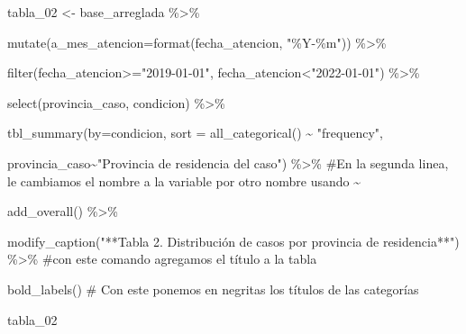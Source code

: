 \documentclass[
  letterpaper,
  DIV=11,
  numbers=noendperiod]{scrreprt}
\newenvironment{Shaded}{\begin{snugshade}}{\end{snugshade}}
\newcommand{\AttributeTok}[1]{\textcolor[rgb]{0.40,0.45,0.13}{#1}}
\newcommand{\CommentTok}[1]{\textcolor[rgb]{0.37,0.37,0.37}{#1}}
\newcommand{\FunctionTok}[1]{\textcolor[rgb]{0.28,0.35,0.67}{#1}}
\newcommand{\NormalTok}[1]{\textcolor[rgb]{0.00,0.23,0.31}{#1}}
\newcommand{\OtherTok}[1]{\textcolor[rgb]{0.00,0.23,0.31}{#1}}
\newcommand{\SpecialCharTok}[1]{\textcolor[rgb]{0.37,0.37,0.37}{#1}}
\newcommand{\StringTok}[1]{\textcolor[rgb]{0.13,0.47,0.30}{#1}}
\begin{document}
\begin{Shaded}
\begin{Highlighting}[]
\NormalTok{tabla\_02 }\OtherTok{\textless{}{-}}\NormalTok{ base\_arreglada }\SpecialCharTok{\%\textgreater{}\%}
  
  \FunctionTok{mutate}\NormalTok{(}\AttributeTok{a\_mes\_atencion=}\FunctionTok{format}\NormalTok{(fecha\_atencion, }\StringTok{"\%Y{-}\%m"}\NormalTok{)) }\SpecialCharTok{\%\textgreater{}\%} 
 
  \FunctionTok{filter}\NormalTok{(fecha\_atencion}\SpecialCharTok{\textgreater{}=}\StringTok{"2019{-}01{-}01"}\NormalTok{, fecha\_atencion}\SpecialCharTok{\textless{}}\StringTok{"2022{-}01{-}01"}\NormalTok{) }\SpecialCharTok{\%\textgreater{}\%} 
  
  \FunctionTok{select}\NormalTok{(provincia\_caso, condicion) }\SpecialCharTok{\%\textgreater{}\%} 
  
  \FunctionTok{tbl\_summary}\NormalTok{(}\AttributeTok{by=}\NormalTok{condicion, }\AttributeTok{sort =} \FunctionTok{all\_categorical}\NormalTok{() }\SpecialCharTok{\textasciitilde{}} \StringTok{"frequency"}\NormalTok{,}
              
\NormalTok{              provincia\_caso}\SpecialCharTok{\textasciitilde{}}\StringTok{"Provincia de residencia del caso"}\NormalTok{) }\SpecialCharTok{\%\textgreater{}\%}  \CommentTok{\#En la segunda linea, le cambiamos el nombre a la variable por otro nombre usando \textasciitilde{}}
  
  \FunctionTok{add\_overall}\NormalTok{() }\SpecialCharTok{\%\textgreater{}\%} 
  
  \FunctionTok{modify\_caption}\NormalTok{(}\StringTok{"**Tabla 2. Distribución de casos por provincia de residencia**"}\NormalTok{) }\SpecialCharTok{\%\textgreater{}\%} \CommentTok{\#con este comando agregamos el título a la tabla}
  
  \FunctionTok{bold\_labels}\NormalTok{() }\CommentTok{\# Con este ponemos en negritas los títulos de las categorías}




\NormalTok{tabla\_02}
\end{Highlighting}
\end{Shaded}
\end{document}
